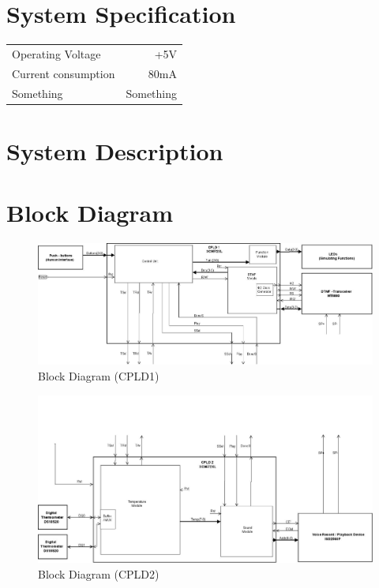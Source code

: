\documentclass[a4paper,11pt]{article}
\begin{document}
\section{System Specification}

	\begin{tabular}{ l r}
	   Operating Voltage & +5V\\
	   Current consumption & ~80mA\\
	   Something & Something\\
	\end{tabular}

\section{System Description}

\section{Block Diagram}

	\begin{figure}[h!]
	  \centering
	      \includegraphics[scale=0.48, angle=90]{BlockDiagramCPLD1.jpg}
	  	\caption{Block Diagram (CPLD1)}
	\end{figure}

	\begin{figure}[h!]
	  \centering
	      \includegraphics[scale=0.48, angle=90]{BlockDiagramCPLD2.jpg}
	  	\caption{Block Diagram (CPLD2)}
	\end{figure}
\end{document}
